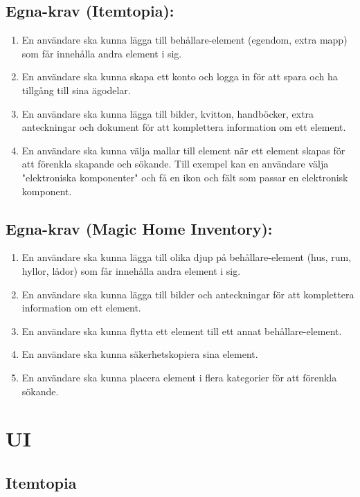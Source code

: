 \documentclass{article}
\begin{document}
\subsection{Egna-krav (Itemtopia):}
\begin{enumerate}
\item En användare ska kunna lägga till behållare-element (egendom, extra mapp) som får innehålla andra element i sig.
\item En användare ska kunna skapa ett konto och logga in för att spara och ha tillgång till sina ägodelar.
\item En användare ska kunna lägga till bilder, kvitton, handböcker, extra anteckningar och dokument för att komplettera information om ett element.
\item En användare ska kunna välja mallar till element när ett element skapas för att förenkla skapande och sökande. Till exempel kan en användare välja "elektroniska komponenter" och få en ikon och fält som passar en elektronisk komponent.
\end{enumerate}

\subsection{Egna-krav (Magic Home Inventory):}
\begin{enumerate}
\item En användare ska kunna lägga till olika djup på behållare-element (hus, rum, hyllor, lådor) som får innehålla andra element i sig.
\item En användare ska kunna lägga till bilder och anteckningar för att komplettera information om ett element.
\item En användare ska kunna flytta ett element till ett annat behållare-element.
\item En användare ska kunna säkerhetskopiera sina element.
\item En användare ska kunna placera element i flera kategorier för att förenkla sökande.
\end{enumerate}


\section{UI}

\subsection{Itemtopia}
\end{document}
